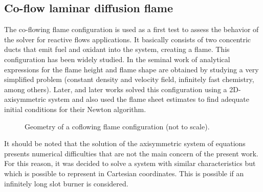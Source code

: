 
\subsection{Co-flow laminar diffusion flame}\label{ssec:coflowFlame}
The co-flowing flame configuration is used as a first test to assess the behavior of the solver for reactive flows applications. It basically consists of two concentric ducts that emit fuel and oxidant into the system, creating a flame. This configuration has been widely studied. In the seminal work of \cite{burkeDiffusionFlames1928} analytical expressions for the flame height and flame shape are obtained by studying a very simplified problem (constant density and velocity field, infinitely fast chemistry, among others). Later, \cite{smookeNumericalModelingAxisymmetric1992} and later works solved this configuration using a 2D-axisymmetric system and also used the flame sheet estimates to find adequate initial conditions for their Newton algorithm. 
\begin{figure}[t]
	\centering
	\def\svgwidth{0.38\textwidth}
	\qquad\quad
	\def\svgwidth{0.35\textwidth}
	\caption{Geometry of a coflowing flame configuration (not to scale).} \label{fig:CoFlowGeometry}
\end{figure}
It should be noted that the solution of the axisymmetric system of equations presents numerical difficulties that are not the main concern of the present work. For this reason, it was decided to solve a system with similar characteristics but which is possible to represent in Cartesian coordinates. This is possible if an infinitely long slot burner is considered.
